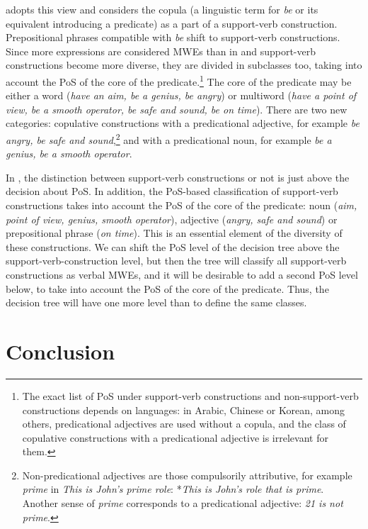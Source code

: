 \documentclass[output=paper]{langsci/langscibook}
\begin{document}
 adopts this view and considers the copula (a linguistic term for \textit{be} or its equivalent introducing a predicate) as a part of a support-verb construction. Prepositional phrases compatible with \textit{be} shift to support-verb constructions. Since more expressions are considered MWEs than in  and support-verb constructions become more diverse, they are divided in subclasses too, taking into account the PoS of the core of the predicate.\footnote{The exact list of PoS under support-verb constructions and non-support-verb constructions depends on languages: in Arabic, Chinese or Korean, among others, predicational adjectives are used without a copula, and the class of copulative constructions with a predicational adjective is irrelevant for them.} The core of the predicate may be either a word (\textit{have an aim,  be a genius,  be angry}) or multiword (\textit{have a point of view, be a smooth operator, be safe and sound, be on time}). There are two new categories: copulative constructions with a predicational adjective, for example \textit{be angry, be safe and sound},\footnote{Non-predicational adjectives are those compulsorily attributive, for example \textit{prime} in \textit{This is John’s prime role}: *\textit{This is John’s role that is prime}. Another sense of \textit{prime} corresponds to a predicational adjective: \textit{21 is not prime}.} and with a predicational noun, for example \textit{be a genius, be a smooth operator}. 

In , the distinction between support-verb constructions or not is just above the decision about PoS. In addition, the PoS-based classification of support-verb constructions takes into account the PoS of the core of the predicate: noun (\textit{aim, point of view, genius, smooth operator}), adjective (\textit{angry, safe and sound}) or prepositional phrase (\textit{on time}). This is an essential element of the diversity of these constructions. We can shift the PoS level of the decision tree above the support-verb-construction level, but then the tree will classify all support-verb constructions as verbal MWEs, and it will be desirable to add a second PoS level below, to take into account the PoS of the core of the predicate. Thus, the decision tree will have one more level than  to define the same classes.


\section{Conclusion}
\end{document}
